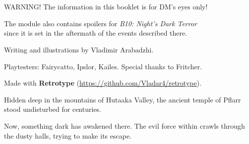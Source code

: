 \documentclass[english,11pt,openany,letterpaper,twocolumn]{book}
\def\author{Vladimir Arabadzhi}
\begin{document}
\setcounter{tocdepth}{0}
\renewcommand{\cftchapleader}{\normalfont\cftdotfill{\cftdotsep}}

\makeatletter
{}
\chapter*{\contentsname
	\@mkboth{%
		\MakeUppercase\contentsname}{\MakeUppercase\contentsname}}%
%
\makeatother

\vfill

\noindent
\begin{minipage}{\textwidth}
\begin{tabbox}[8][8]
\begin{uheaderbox}{WARNING!}
	\centering
	The information in this booklet is for DM's eyes only!
	
	The module also contains spoilers for \emph{B10: Night's Dark Terror}\\since it is set in the aftermath of the events described there.
\end{uheaderbox}
\end{tabbox}
\end{minipage}

\vfill

\noindent
\begin{minipage}{\textwidth}
	\centering
	Writing and illustrations by \author{}.
	
	Playtesters: Fairycatto, Ipslor, Kailes. Special thanks to Fritcher.
	
	Made with \textbf{Retrotype} (\href{https://github.com/Vladar4/retrotype}{https://github.com/Vladar4/retrotype}).
\end{minipage}

\break
\vspace*{1.1\baselineskip}

Hidden deep in the mountains of Hutaaka Valley, the ancient temple of Pflarr stood undisturbed for centuries.

Now, something dark has awakened there. The evil force within crawls through the dusty halls, trying to make its escape.

\vfill
\end{document}
